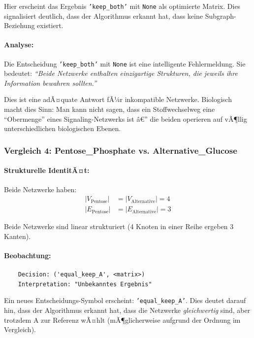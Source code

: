 ﻿\documentclass[a4paper,12pt]{article}
\theoremstyle{definition}
\begin{document}
Hier erscheint das Ergebnis \texttt{'keep\_both'} mit \texttt{None} als optimierte Matrix. Dies signalisiert deutlich, dass der Algorithmus erkannt hat, dass keine Subgraph-Beziehung existiert.

\paragraph{Analyse:}
Die Entscheidung \texttt{'keep\_both'} mit \texttt{None} ist eine intelligente Fehlermeldung. Sie bedeutet: \textit{``Beide Netzwerke enthalten einzigartige Strukturen, die jeweils ihre Information bewahren sollten.''}

Dies ist eine adÃ¤quate Antwort fÃ¼r inkompatible Netzwerke. Biologisch macht dies Sinn: Man kann nicht sagen, dass ein Stoffwechselweg eine ``Obermenge'' eines Signaling-Netzwerks ist â€” die beiden operieren auf vÃ¶llig unterschiedlichen biologischen Ebenen.

\subsubsection{Vergleich 4: Pentose\_Phosphate vs. Alternative\_Glucose}

\paragraph{Strukturelle IdentitÃ¤t:}
Beide Netzwerke haben:
\begin{align*}
	|V_{\text{Pentose}}| &= |V_{\text{Alternative}}| = 4 \\
	|E_{\text{Pentose}}| &= |E_{\text{Alternative}}| = 3
\end{align*}

Beide Netzwerke sind linear strukturiert (4 Knoten in einer Reihe ergeben 3 Kanten).

\paragraph{Beobachtung:}
\begin{verbatim}
	Decision: ('equal_keep_A', <matrix>)
	Interpretation: "Unbekanntes Ergebnis"
\end{verbatim}

Ein neues Entscheidungs-Symbol erscheint: \texttt{'equal\_keep\_A'}. Dies deutet darauf hin, dass der Algorithmus erkannt hat, dass die Netzwerke \textit{gleichwertig} sind, aber trotzdem A zur Referenz wÃ¤hlt (mÃ¶glicherweise aufgrund der Ordnung im Vergleich).
\end{document}
